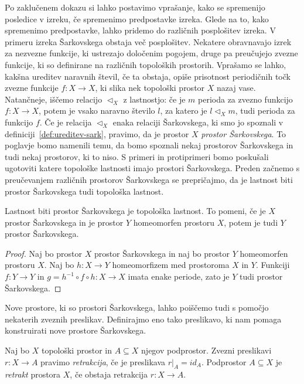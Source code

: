 \documentclass[../TG_magistrsko_delo_sections.tex]{subfiles}
\begin{document}
Po zaklučenem dokazu si lahko postavimo vprašanje, kako se spremenijo posledice v izreku, če spremenimo predpostavke izreka. Glede na to, kako spremenimo predpostavke, lahko pridemo do različnih posplošitev izreka. V primeru izreka Šarkovskega obstaja več posplošitev. Nekatere obravnavajo izrek za nezvezne funkcije, ki ustrezajo določenim pogojem, druge pa preučujejo zvezne funkcije, ki so definirane na različnih topoloških prostorih. Vprašamo se lahko, kakšna ureditev naravnih števil, če ta obstaja, opiše prisotnost periodičnih točk zvezne funkcije $f:X \to X$, ki slika nek topološki prostor $X$ nazaj vase. Natančneje, iščemo relacijo $\triangleleft_X$ z lastnostjo: če je $m$ perioda za zvezno funkcijo $f:X \to X$, potem je vsako naravno število $l$, za katero je $l \triangleleft_X m$, tudi perioda za funkcijo $f$. Če je relacija $\triangleleft_X$ enaka relaciji Šarkovskega, ki smo jo spoznali v definiciji~\ref{def:ureditev-sark}, pravimo, da je prostor $X$ \emph{prostor Šarkovskega}. To poglavje bomo namenili temu, da bomo spoznali nekaj prostorov Šarkovskega in tudi nekaj prostorov, ki to niso. S primeri in protiprimeri bomo poskušali ugotoviti katere topološke lastnosti imajo prostori Šarkovskega.
Preden začnemo s preučevanjem različnih prostorov Šarkovskega se prepričajmo, da je lastnost biti prostor Šarkovskega tudi topološka lastnost. 
\begin{trditev}
Lastnost biti prostor Šarkovskega je topološka lastnost. To pomeni, če je $X$ prostor Šarkovskega in je prostor $Y$ homeomorfen prostoru $X$, potem je tudi $Y$ prostor Šarkovskega.
\end{trditev}
\begin{proof}
Naj bo prostor $X$ prostor Šarkovskega in naj bo prostor $Y$ homeomorfen prostoru $X$. Naj bo $h : X \to Y$ homeomorfizem med prostoroma $X$ in $Y$. Funkciji $f : Y \to Y$ in $g = h^{-1} \circ f \circ h : X \to X$ imata enake periode, zato je $Y$ tudi prostor Šarkovskega.
\end{proof}

Nove prostore, ki so prostori Šarkovskega, lahko poiščemo tudi s pomočjo nekaterih zveznih preslikav. Definirajmo eno tako preslikavo, ki nam pomaga konstruirati nove prostore Šarkovskega.
\begin{definicija}
Naj bo $X$ topološki prostor in $A \subseteq X$ njegov podprostor. Zvezni preslikavi $r : X \to A$ pravimo \emph{retrakcija}, če je preslikava $r|_A = id_A$. Podprostor $A \subseteq X$ je \emph{retrakt} prostora $X$, če obstaja retrakcija $r: X \to A$.
\end{definicija}
\end{document}
